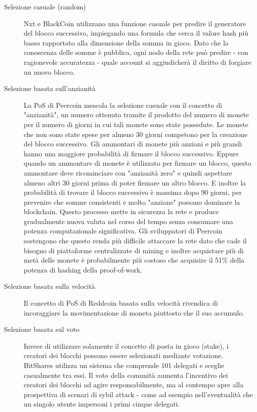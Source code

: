 \begin{description}
  \item[Selezione casuale (random)] Nxt e BlackCoin utilizzano una funzione casuale per predire il generatore del blocco successivo, impiegando una formula che cerca il valore hash più basso rapportato alla dimensione della somma in gioco. Dato che la conoscenza delle somme è pubblica, ogni nodo della rete può predire - con ragionevole accuratezza - quale account si aggiudicherà il diritto di forgiare un nuovo blocco.
  \item[Selezione basata sull'anzianità] La PoS di Peercoin mescola la selezione casuale con il concetto di "anzianità", un numero ottenuto tramite il prodotto del numero di monete per il numero di giorni in cui tali monete sono state possedute. Le monete che non sono state spese per almeno 30 giorni competono per la creazione del blocco successivo. Gli ammontari di monete più anziani e più grandi hanno una maggiore probabilità di firmare il blocco successivo. Eppure quando un ammontare di monete è utilizzato per firmare un blocco, questo ammontare deve ricominciare con "anzianità zero" e quindi aspettare almeno altri 30 giorni prima di poter firmare un altro blocco. E inoltre la probabilità di trovare il blocco successivo è massima dopo 90 giorni, per prevenire che somme consistenti e molto "anziane" possano dominare la blockchain. Questo processo mette in sicurezza la rete e produce gradualmente nuova valuta nel corso del tempo senza consumare una potenza computazionale significativa. Gli sviluppatori di Peercoin sostengono che questo renda più difficile attaccare la rete dato che cade il bisogno di piattaforme centralizzate di mining e inoltre acquistare più di metà delle monete è probabilmente più costoso che acquisire il 51\% della potenza di hashing della proof-of-work.
  \item[Selezione basata sulla velocità] Il concetto di PoS di Reddcoin basata sulla velocità rivendica di incoraggiare la movimentazione di moneta piuttosto che il suo accumulo.
  \item[Selezione basata sul voto] Invece di utilizzare solamente il concetto di posta in gioco (stake), i creatori dei blocchi possono essere selezionati mediante votazione. BitShares utilizza un sistema che comprende 101 delegati e sceglie casualmente tra essi. Il voto della comunità aumenta l'incentivo dei creatori dei blocchi ad agire responsabilmente, ma al contempo apre alla prospettiva di scenari di sybil attack - come ad esempio nell'eventualità che un singolo utente impersoni i primi cinque delegati. 
\end{description}


